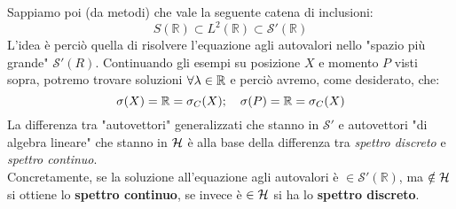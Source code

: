 \documentclass[12pt]{article}
\begin{document}
Sappiamo poi (da metodi) che vale la seguente catena di inclusioni:
\begin{equation}
S\left(\mathbb{R}\right)\subset L^2\left(\mathbb{R}\right)\subset \mathcal{S}'\left(\mathbb{R}\right)
\label{eqn:triplettametodi}
\end{equation}
L'idea è perciò quella di risolvere l'equazione agli autovalori nello "spazio più grande" $\mathcal{S}'(R)$. Continuando gli esempi su posizione $X$ e momento $P$ visti sopra, potremo trovare soluzioni $\forall \lambda \in \mathbb{R}$ e perciò avremo, come desiderato, che:
\[
\sigma(X) = \mathbb{R} = \sigma_C(X); \quad \sigma(P) = \mathbb{R} = \sigma_C(X)
\]
La differenza tra "autovettori" generalizzati che stanno in $\mathcal{S}'$ e autovettori "di algebra lineare" che stanno in $\mathcal{H}$ è alla base della differenza tra \textit{spettro discreto} e \textit{spettro continuo}.\\
Concretamente, se la soluzione all'equazione agli autovalori è $\in \mathcal{S}'\left(\mathbb{R}\right)$, ma $\notin \mathcal{H}$ si ottiene lo \textbf{spettro continuo}, se invece è $\in \mathcal{H}$ si ha lo \textbf{spettro discreto}.\\
\end{document}

